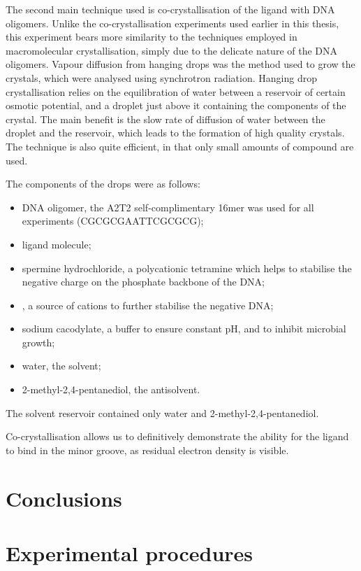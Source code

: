 \begin{refsection}
The second main technique used is co-crystallisation of the ligand with DNA oligomers.
Unlike the co-crystallisation experiments used earlier in this thesis, this experiment bears more similarity to the techniques employed in macromolecular crystallisation, simply due to the delicate nature of the DNA oligomers.
Vapour diffusion from hanging drops was the method used to grow the crystals, which were analysed using synchrotron radiation.
Hanging drop crystallisation relies on the equilibration of water between a reservoir of certain osmotic potential, and a droplet just above it containing the components of the crystal.
The main benefit is the slow rate of diffusion of water between the droplet and the reservoir, which leads to the formation of high quality crystals.
The technique is also quite efficient, in that only small amounts of compound are used.

The components of the drops were as follows:
\begin{itemize}
    \item DNA oligomer, the A2T2 self-complimentary 16mer was used for all experiments (CGCGCGAATTCGCGCG);
    \item ligand molecule;
    \item spermine hydrochloride, a polycationic tetramine which helps to stabilise the negative charge on the phosphate backbone of the DNA;
    \item {}, a source of  cations to further stabilise the negative DNA;
    \item sodium cacodylate, a buffer to ensure constant pH, and to inhibit microbial growth;
    \item water, the solvent;
    \item 2-methyl-2,4-pentanediol, the antisolvent.
\end{itemize}

The solvent reservoir contained only water and 2-methyl-2,4-pentanediol.

Co-crystallisation allows us to definitively demonstrate the ability for the ligand to bind in the minor groove, as residual electron density is visible.


\section{Conclusions}

\section{Experimental procedures}


\end{refsection}

